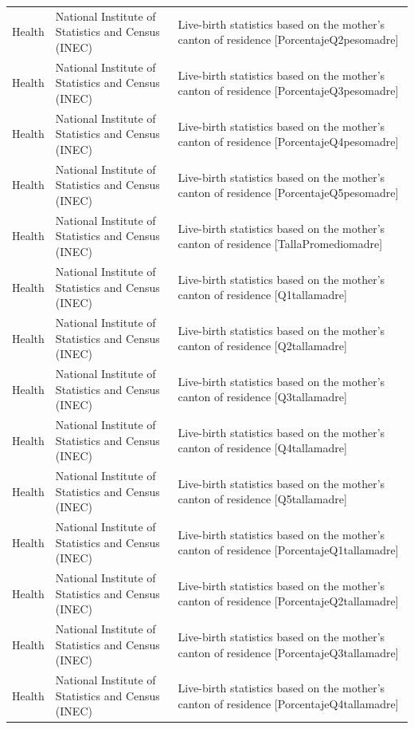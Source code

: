 \documentclass[10pt,a4paper]{article}
\begin{document}
\begin{longtable}{@{}>{\raggedright\arraybackslash}p{3.5cm}>{\raggedright\arraybackslash}p{5.6cm}>{\raggedright\arraybackslash}p{\dimexpr\textwidth-9.1cm-4\tabcolsep\relax}@{}}
Health & National Institute of Statistics and Census (INEC) & Live-birth statistics based on the mother's canton of residence [PorcentajeQ2pesomadre]\\
Health & National Institute of Statistics and Census (INEC) & Live-birth statistics based on the mother's canton of residence [PorcentajeQ3pesomadre]\\
Health & National Institute of Statistics and Census (INEC) & Live-birth statistics based on the mother's canton of residence [PorcentajeQ4pesomadre]\\
Health & National Institute of Statistics and Census (INEC) & Live-birth statistics based on the mother's canton of residence [PorcentajeQ5pesomadre]\\
Health & National Institute of Statistics and Census (INEC) & Live-birth statistics based on the mother's canton of residence [TallaPromediomadre]\\
Health & National Institute of Statistics and Census (INEC) & Live-birth statistics based on the mother's canton of residence [Q1tallamadre]\\
Health & National Institute of Statistics and Census (INEC) & Live-birth statistics based on the mother's canton of residence [Q2tallamadre]\\
Health & National Institute of Statistics and Census (INEC) & Live-birth statistics based on the mother's canton of residence [Q3tallamadre]\\
Health & National Institute of Statistics and Census (INEC) & Live-birth statistics based on the mother's canton of residence [Q4tallamadre]\\
Health & National Institute of Statistics and Census (INEC) & Live-birth statistics based on the mother's canton of residence [Q5tallamadre]\\
Health & National Institute of Statistics and Census (INEC) & Live-birth statistics based on the mother's canton of residence [PorcentajeQ1tallamadre]\\
Health & National Institute of Statistics and Census (INEC) & Live-birth statistics based on the mother's canton of residence [PorcentajeQ2tallamadre]\\
Health & National Institute of Statistics and Census (INEC) & Live-birth statistics based on the mother's canton of residence [PorcentajeQ3tallamadre]\\
Health & National Institute of Statistics and Census (INEC) & Live-birth statistics based on the mother's canton of residence [PorcentajeQ4tallamadre]\\

\end{longtable}
\end{document}
